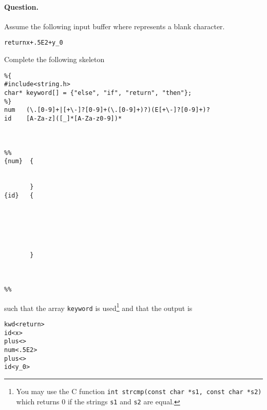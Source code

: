 \paragraph{Question.} Assume the following input buffer
where \textvisiblespace{} represents a blank character.
\begin{alltt}
return\textvisiblespace\textvisiblespace{}x+\textvisiblespace{}.5E2+y_0
\end{alltt}
Complete the following \Lex skeleton
{\small
\begin{verbatim}
%{
#include<string.h>
char* keyword[] = {"else", "if", "return", "then"};
%}
num   (\.[0-9]+|[+\-]?[0-9]+(\.[0-9]+)?)(E[+\-]?[0-9]+)?
id    [A-Za-z]([_]*[A-Za-z0-9])*



%%
{num}  {


       }
{id}   {






       }



%%
\end{verbatim}
}
\noindent such that the array \texttt{keyword} is used\footnote{You
  may use the C function \texttt{int strcmp(const char *s1, const char
    *s2)} which returns 0 if the strings \texttt{s1} and \texttt{s2}
  are equal.} and that the output is {\small
\begin{verbatim}
kwd<return>
id<x> 
plus<>
num<.5E2>
plus<>
id<y_0>
\end{verbatim}
}
